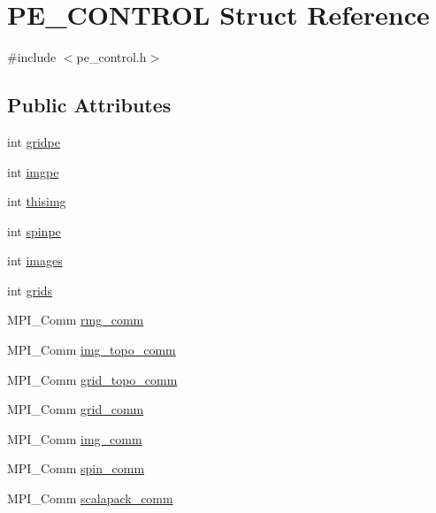 \hypertarget{struct_p_e___c_o_n_t_r_o_l}{\section{P\-E\-\_\-\-C\-O\-N\-T\-R\-O\-L Struct Reference}
\label{struct_p_e___c_o_n_t_r_o_l}
}


{\ttfamily \#include $<$pe\-\_\-control.\-h$>$}

\subsection*{Public Attributes}
\begin{DoxyCompactItemize}
\item 
int \hyperlink{struct_p_e___c_o_n_t_r_o_l_a7f4c0f0721be082565236a183b6d13ab}{gridpe}
\item 
int \hyperlink{struct_p_e___c_o_n_t_r_o_l_ace162e288d74cd36e453769e9b2f64a2}{imgpe}
\item 
int \hyperlink{struct_p_e___c_o_n_t_r_o_l_ac7823a79e3055f308a3238f4d493804a}{thisimg}
\item 
int \hyperlink{struct_p_e___c_o_n_t_r_o_l_a877b8c0fc737468c0c2635b3f1a60c51}{spinpe}
\item 
int \hyperlink{struct_p_e___c_o_n_t_r_o_l_a6022ac13fbeda8bc938d2a1aa584fbea}{images}
\item 
int \hyperlink{struct_p_e___c_o_n_t_r_o_l_ae44c86d95d75ae6b911a8e07c074e623}{grids}
\item 
M\-P\-I\-\_\-\-Comm \hyperlink{struct_p_e___c_o_n_t_r_o_l_a8f7c007c153b22e721c538be6e49535c}{rmg\-\_\-comm}
\item 
M\-P\-I\-\_\-\-Comm \hyperlink{struct_p_e___c_o_n_t_r_o_l_aa8eece1731a99b7280e64ae5c5735425}{img\-\_\-topo\-\_\-comm}
\item 
M\-P\-I\-\_\-\-Comm \hyperlink{struct_p_e___c_o_n_t_r_o_l_a1af3538d0763d83ea0826f775cb9bf74}{grid\-\_\-topo\-\_\-comm}
\item 
M\-P\-I\-\_\-\-Comm \hyperlink{struct_p_e___c_o_n_t_r_o_l_a7416f0554346c4b563fb2d4d742b9d4f}{grid\-\_\-comm}
\item 
M\-P\-I\-\_\-\-Comm \hyperlink{struct_p_e___c_o_n_t_r_o_l_a67bb0b998f75df1ba56dcd59c31d5dba}{img\-\_\-comm}
\item 
M\-P\-I\-\_\-\-Comm \hyperlink{struct_p_e___c_o_n_t_r_o_l_a61fe5a83c5da6ce2c06c8626a0bdfde3}{spin\-\_\-comm}
\item 
M\-P\-I\-\_\-\-Comm \hyperlink{struct_p_e___c_o_n_t_r_o_l_a5e05368119cbdbd642716e02c91c2f04}{scalapack\-\_\-comm}

\end{DoxyCompactItemize}
